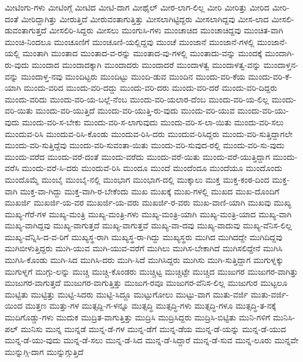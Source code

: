 {ಮೀಟಿಂಗು-ಗಳು
ಮೀಟಿಂಗ್ಗೆ
ಮೀಟಿದ
ಮೀಟಿ-ದಾಗ
ಮೀಥೈಲ್
ಮೀರ-ಲಾಗ-ಲಿಲ್ಲ
ಮೀರಿ
ಮೀರಿತ್ತು
ಮೀರಿದ
ಮೀರಿ-ದಂತೆ
ಮೀರಿದ್ದಾಗಿತ್ತು
ಮೀರುತ್ತಿದೆ
ಮೀರುವಂತಾಗುತ್ತಿತ್ತು
ಮೀಸಲಾಗಿಟ್ಟಿದ್ದರು
ಮೀಸಲಾಗಿದ್ದವು
ಮೀಸ-ಲಾದ
ಮೀಸಲಿ-ಡುವಂತಾಗುತ್ತದೆ
ಮೀಸಲಿರಿ-ಸಿದ್ದರು
ಮೀಸಲು
ಮುಂಗುಸಿ-ಗಳು
ಮುಂಚಾಚಿದ
ಮುಂಚಾಚಿದ್ದವು
ಮುಂಚಿತ-ವಾಗಿ
ಮುಂಚಿ-ನಿಂದಲೂ
ಮುಂಚೂಣಿಗೆ
ಮುಂಚೂಣಿ-ಯಲ್ಲಿದ್ದವು
ಮುಂಚೆ
ಮುಂಜಾನೆ
ಮುಂಜಾನೆ-ಗಳಲ್ಲಿ
ಮುಂಜಾನೆ-ಯಲ್ಲಿ
ಮುಂತಾಗಿ
ಮುಂತಾದ
ಮುಂತಾದ-ವ-ರನ್ನು
ಮುಂತಾದ-ವು-ಗಳಲ್ಲಿ
ಮುಂತಾದು-ವನ್ನು
ಮುಂದಕ್ಕೆ
ಮುಂದಾಗಿ-ರು-ವುದು
ಮುಂದಾದ
ಮುಂದಾದಕ್ಕಾಗಿ
ಮುಂದಾದರು
ಮುಂದಾದರೆ
ಮುಂದಾಳತ್ವ
ಮುಂದಾಳತ್ವ-ವನ್ನು
ಮುಂದಾಳ್ತನ-ವನ್ನು
ಮುಂದಾಳ್ತ-ನವು
ಮುಂದಿಟ್ಟರು
ಮುಂದಿಟ್ಟು
ಮುಂದಿ-ಡುವ
ಮುಂದಿನ
ಮುಂದು-ವರಿ-ಕೆಯ
ಮುಂದು-ವರಿ-ಕೆ-ಯಾಗಿ
ಮುಂದು-ವರಿದ
ಮುಂದು-ವರಿ-ದದ್ದು
ಮುಂದು-ವರಿ-ದರು
ಮುಂದು-ವರಿ-ದರೆ
ಮುಂದು-ವರಿ-ದಿದ್ದರು
ಮುಂದು-ವರಿದು
ಮುಂದು-ವರಿ-ಯ-ಬಲ್ಲೆ-ನೆಂಬ
ಮುಂದು-ವರಿ-ಯಲಾರ-ದೆಂಬ
ಮುಂದು-ವರಿ-ಯ-ಲಿಲ್ಲ
ಮುಂದು-ವರಿ-ಯಿತು
ಮುಂದು-ವರಿ-ಯುತ್ತಿದೆ
ಮುಂದು-ವರಿ-ಯುತ್ತಿ-ರು-ವುದು
ಮುಂದು-ವರಿ-ಯುವ
ಮುಂದು-ವರಿ-ಯು-ವುದು
ಮುಂದು-ವರಿ-ಸ-ಬೇಕು
ಮುಂದು-ವರಿ-ಸ-ಲಾಗುವುದು
ಮುಂದು-ವರಿ-ಸ-ಲಾ-ಯಿತು
ಮುಂದು-ವರಿ-ಸಲು
ಮುಂದುವ-ರಿಸಿ
ಮುಂದುವ-ರಿಸಿ-ಕೊಂಡು
ಮುಂದುವ-ರಿಸಿ-ದರು
ಮುಂದುವ-ರಿಸಿದ್ದರು
ಮುಂದು-ವರಿ-ಸುತ್ತಿದ್ದಾಗಲೇ
ಮುಂದು-ವರಿ-ಸುತ್ತಿದ್ದೆವು
ಮುಂದು-ವರಿ-ಸುವಂತಾ-ಯಿತು
ಮುಂದು-ವರಿ-ಸುವುದ-ರಲ್ಲಿ
ಮುಂದು-ವರಿ-ಸು-ವುದು
ಮುಂದು-ವರೆದ
ಮುಂದು-ವರೆ-ದಂತೆ
ಮುಂದು-ವರೆದು
ಮುಂದು-ವರೆ-ಯಿತು
ಮುಂದು-ವರೆ-ಯುತ್ತಿದ್ದಾಗ
ಮುಂದು-ವರೆಸಿ
ಮುಂದು-ವರೆ-ಸಿ-ದರು
ಮುಂದುವೆ-ರಿಸಿ
ಮುಂದೂ
ಮುಂದೆ
ಮುಂದೆಂದೂ
ಮುಂದೆಯೂ
ಮುಂದೊಂದು
ಮುಂದೊಮ್ಮೆ
ಮುಂಬೈ
ಮುಂಬೈ-ನಲ್ಲಿ
ಮುಂಭಾಗ
ಮುಂಭಾಗ-ದಲ್ಲಿ
ಮುಕ್ಕಾಲು
ಮುಕ್ತ
ಮುಕ್ತ-ಕಂಠ-ದಿಂದ
ಮುಕ್ತ-ವಾಗಿ
ಮುಕ್ತ-ವಾ-ಗಿದ್ದು
ಮುಕ್ತ-ವಾಗಿ-ರ-ಬೇಕೆಂದು
ಮುಖ
ಮುಖಕ್ಕೆ
ಮುಖ-ಗಳಲ್ಲಿ
ಮುಖದ
ಮುಖ-ದೊಂದಿಗೆ
ಮುಖರ್ಜಿ
ಮುಖರ್ಜಿ-ಯ-ವರ
ಮುಖರ್ಜಿ-ಯ-ವರು
ಮುಖರ್ಜಿ-ರ-ವರು
ಮುಖ-ವಾಣಿ-ಯಾಗಿ
ಮುಖವು
ಮುಖ್ಯ
ಮುಖ್ಯ-ಗೆರೆ-ಗಳ
ಮುಖ್ಯ-ಮಂತ್ರಿ
ಮುಖ್ಯ-ಮಂತ್ರಿ-ಗಳು
ಮುಖ್ಯ-ಮಂತ್ರಿ-ಯಾಗಿ
ಮುಖ್ಯ-ಮಂತ್ರಿ-ಯಾದ
ಮುಖ್ಯ-ವಾಗಿ
ಮುಖ್ಯ-ವಾಗಿದ್ದವು
ಮುಖ್ಯ-ವಾಗುತ್ತದೆ
ಮುಖ್ಯ-ವಾಗುತ್ತವೆ
ಮುಖ್ಯ-ವಾ-ದವು
ಮುಖ್ಯ-ವಾದುವು
ಮುಖ್ಯ-ವೆನಿಸ-ಲಿಲ್ಲ
ಮುಖ್ಯ-ವೆನ್ನಿಸಿ-ದ-ವ-ರಿಗೆ
ಮುಖ್ಯಸ್ಥ-ರಾಗಿ
ಮುಖ್ಯಸ್ಥ-ರಾ-ಗಿದ್ದು
ಮುಖ್ಯಸ್ಥರು
ಮುಗಿದ
ಮುಗಿದದ್ದೇ
ಮುಗಿದಿದ್ದವು
ಮುಗಿಬೀಳುತ್ತಿದ್ದರು
ಮುಗಿ-ಯುವ
ಮುಗಿ-ಯುವ-ವರೆಗೆ
ಮುಗಿಲು
ಮುಗಿಸ-ಬೇಕಾಗಿದೆ
ಮುಗಿಸಲಿದ್ದೇನೆ
ಮುಗಿಸಿ
ಮುಗಿಸಿ-ಕೊಂಡು
ಮುಗಿ-ಸಿದ
ಮುಗಿಸಿ-ದರು
ಮುಗಿ-ಸಿದೆ
ಮುಗಿಸಿದ್ದರು
ಮುಗಿಸು
ಮುಗಿ-ಸುತ್ತಿದ್ದಾಗ
ಮುಗುಳ್ನಕ್ಕು
ಮುಗುಳ್ನಗೆ
ಮುಗ್ಗು-ಲನ್ನು
ಮುಚ್ಚಿ
ಮುಚ್ಚಿ-ಕೊಂಡರು
ಮುಚ್ಚಿಟ್ಟ
ಮುಚ್ಚಿಟ್ಟೇ
ಮುಚ್ಚಿದ
ಮುಜುಗರ
ಮುಜುಗರ-ವಾಗಿತ್ತು
ಮುಜುಗರ-ವಾಗುತ್ತದೆ
ಮುಜುಗರ-ವಾಗುತ್ತಿತ್ತು
ಮುಜುಗ-ರವೂ
ಮುಜುಗರ-ವೆನಿಸ-ಲಿಲ್ಲ
ಮುಜುಗುರ
ಮುಟ್ಟಲೂ
ಮುಟ್ಟಿತು
ಮುಟ್ಟಿತ್ತು
ಮುಟ್ಟಿ-ಸಿದರು
ಮುಟ್ಟಿ-ಸಿದ್ದೂ
ಮುಟ್ಟುಗೋಲು
ಮುಟ್ಟು-ವಾಗ
ಮುತು-ವರ್ಜಿ
ಮುತು-ವರ್ಜಿ-ಯಿಂದ
ಮುತ್ತಣ
ಮುತ್ತು-ಗಳ
ಮುತ್ಸದ್ದಿ-ಗ-ಳನ್ನೂ
ಮುತ್ಸದ್ಧಿ
ಮುತ್ಸದ್ಧಿ-ಗಳು
ಮುತ್ಸದ್ಧಿ-ಗಳೂ
ಮುತ್ಸದ್ಧಿ-ತ-ನಕ್ಕೆ
ಮುದಿಗೊಡ್ಡು-ಗಳು
ಮುದುಕ
ಮುದ್ರಿತ-ವಾಗುತ್ತಿತ್ತು
ಮುದ್ರಿಸಿ
ಮುದ್ರಿಸಿದ್ದರು
ಮುದ್ರಿಸಿ-ಬಿಟ್ಟಿತು
ಮುನಿ-ಗಳಿಗೆ
ಮುನಿಸಿ-ಪಲ್
ಮುನಿಸು
ಮುನ್ನ
ಮುನ್ನಡೆ
ಮುನ್ನ-ಡೆ-ಗಳ
ಮುನ್ನ-ಡೆಗೆ
ಮುನ್ನ-ಡೆಯ
ಮುನ್ನ-ಡೆ-ಯನ್ನು
ಮುನ್ನ-ಡೆ-ಯುದ
ಮುನ್ನ-ಡೆ-ಯು-ವುದು
ಮುನ್ನ-ಡೆ-ಸಲು
ಮುನ್ನ-ಡೆ-ಸಿದ
ಮುನ್ನ-ಡೆ-ಸಿದ್ದಾರೆ
ಮುನ್ನ-ಡೆ-ಸುವ
ಮುನ್ನ-ಲೂರು
ಮುನ್ನವೇ
ಮುನ್ನುಗ್ಗಿ-ದಾಗ
ಮುನ್ನುಗ್ಗುತ್ತಿದೆ
}
